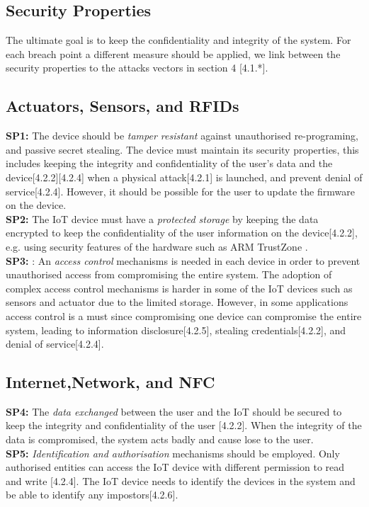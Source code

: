 \documentclass{llncs}
\begin{document}
\subsection{Security Properties}
The ultimate goal is to keep the confidentiality and integrity of the system. For each breach point a different measure should be applied, we link between the security properties to the attacks vectors in section 4 [4.1.*].
\subsection*{Actuators, Sensors, and RFIDs}
\textbf{SP1:} The device should be \textit{tamper resistant} against unauthorised re-programing, and passive secret stealing. The device must maintain its security properties, this includes keeping the integrity and confidentiality of the user's data and the device[4.2.2][4.2.4] when a physical attack[4.2.1] is launched, and prevent denial of service[4.2.4]. However, it should be possible for the user to update the firmware on the device. \\
\textbf{SP2:} The IoT device must have a \textit{protected storage} by keeping the data encrypted to keep the confidentiality of the user information on the device[4.2.2], e.g. using security features of the hardware such as ARM TrustZone \cite{Namiluko2013}.\\
\textbf{SP3:} : An \textit{ access control} mechanisms is needed in each device in order to prevent unauthorised access from compromising the entire system. The adoption of complex access control mechanisms is harder in some of the IoT devices such as sensors and actuator due to the limited storage. However, in some applications access control is a must since compromising one device can compromise the entire system, leading to information disclosure[4.2.5], stealing credentials[4.2.2], and denial of service[4.2.4]. \\
\subsection*{Internet,Network, and NFC}
\textbf{SP4:} The \textit{data exchanged} between the user and the IoT should be secured to keep the integrity and confidentiality of the user [4.2.2]. When the integrity of the data is compromised, the system acts badly and cause lose to the user.  \\
\textbf{SP5:} \textit{Identification and authorisation} mechanisms should be employed. Only authorised entities can access the IoT device with different permission to read and write [4.2.4]. The IoT device needs to identify the devices in the system and be able to identify any impostors[4.2.6]. \\
\end{document}
